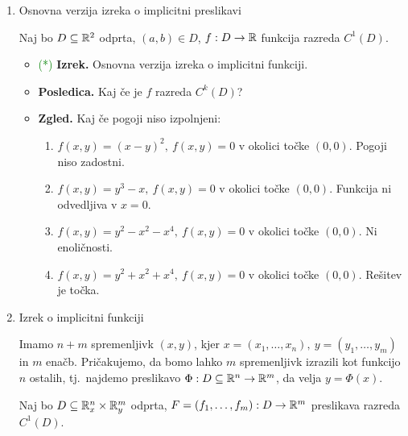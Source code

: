 \begin{enumerate}
    \item Osnovna verzija izreka o implicitni preslikavi
    
    Naj bo $D \subseteq \mathbb{R}^2$ odprta, $(a, b) \in D$, $f: D \to \mathbb{R}$ funkcija razreda $C^1(D)$.
    \begin{itemize}
        \item \textcolor{green}{(*)} \textbf{Izrek.} Osnovna verzija izreka o implicitni funkciji.
        \item \textbf{Posledica.} Kaj če je $f$ razreda $C^k(D)$?
        \item \textbf{Zgled.} Kaj če pogoji niso izpolnjeni:
        \begin{enumerate}
            \item $f(x,y) = (x-y)^2, \ f(x,y) = 0$ v okolici točke $(0,0)$. Pogoji niso zadostni.
            \item $f(x,y) = y^3-x, \ f(x,y) = 0$ v okolici točke $(0,0)$. Funkcija ni odvedljiva v \(x = 0\).
            \item $f(x,y) = y^2-x^2-x^4, \ f(x,y) = 0$ v okolici točke $(0,0)$. Ni enoličnosti.
            \item $f(x,y) = y^2+x^2+x^4,  \ f(x,y) = 0$ v okolici točke $(0,0)$. Rešitev je točka.
        \end{enumerate}
    \end{itemize}

    \item Izrek o implicitni funkciji
    
    Imamo $n+m$ spremenljivk $(x,y)$, kjer $x = (x_1, \ldots, x_n), \ y = (y_1, \ldots, y_m)$ in $m$ enačb. Pričakujemo, da bomo lahko $m$ spremenljivk izrazili kot funkcijo $n$ ostalih, tj.\ najdemo preslikavo $\Phi: D \subseteq \mathbb{R}^n \to \mathbb{R}^m$, da velja $y = \Phi(x)$.

    Naj bo $D \subseteq \mathbb{R}^n_x \times \mathbb{R}^m_y$ odprta, $F = (f_1, \ldots, f_m): D \to \mathbb{R}^m$ preslikava razreda $C^1(D)$.


\end{enumerate}
